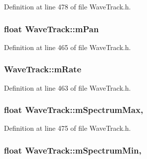 Definition at line 478 of file Wave\+Track.\+h.

\subsubsection[{\texorpdfstring{m\+Pan}{mPan}}]{\setlength{\rightskip}{0pt plus 5cm}float Wave\+Track\+::m\+Pan\hspace{0.3cm}{\ttfamily [protected]}}\hypertarget{class_wave_track_a342936b12f0ed288970c87eaed874b71}{}\label{class_wave_track_a342936b12f0ed288970c87eaed874b71}


Definition at line 465 of file Wave\+Track.\+h.

\subsubsection[{\texorpdfstring{m\+Rate}{mRate}}]{ Wave\+Track\+::m\+Rate\hspace{0.3cm}{\ttfamily [protected]}}\hypertarget{class_wave_track_ac9ff43cf5ca331f25aa7796beaa7c016}{}\label{class_wave_track_ac9ff43cf5ca331f25aa7796beaa7c016}


Definition at line 463 of file Wave\+Track.\+h.

\subsubsection[{\texorpdfstring{m\+Spectrum\+Max}{mSpectrumMax}}]{\setlength{\rightskip}{0pt plus 5cm}float Wave\+Track\+::m\+Spectrum\+Max\hspace{0.3cm}{\ttfamily [mutable]}, {\ttfamily [protected]}}\hypertarget{class_wave_track_a92d5b6594bbe1a2b7dba5121c52882c6}{}\label{class_wave_track_a92d5b6594bbe1a2b7dba5121c52882c6}


Definition at line 475 of file Wave\+Track.\+h.

\subsubsection[{\texorpdfstring{m\+Spectrum\+Min}{mSpectrumMin}}]{\setlength{\rightskip}{0pt plus 5cm}float Wave\+Track\+::m\+Spectrum\+Min\hspace{0.3cm}{\ttfamily [mutable]}, {\ttfamily [protected]}}\hypertarget{class_wave_track_a69645755c41a02f3c20f80f0bf5ced79}{}\label{class_wave_track_a69645755c41a02f3c20f80f0bf5ced79}


